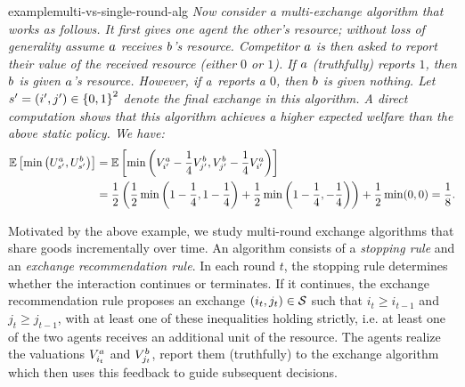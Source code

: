 \begin{restatable}{example}{multi-vs-single-round-alg}
    \emph{
    Now consider a multi-exchange algorithm that works as follows. It first gives one agent the other's resource; without loss of generality assume 
    $a$ receives $b$'s resource. 
    Competitor $a$ is then asked to report their value of the received resource
    (either $0$ or $1$). If $a$ (truthfully) reports $1$, then $b$ is 
    given $a$'s resource. 
    However, if $a$ reports a $0$, then $b$ is given nothing.
    Let $s'=(i',j')\in\left\{0,1\right\}^2$
    denote the final exchange in this algorithm. A direct computation shows that this algorithm achieves a higher expected welfare than the above static policy. We have:
    \begin{align*}
        \mathbb{E}\left[
            \min\left(
                U^a_{s'},U^b_{s'}
            \right)
        \right] 
        &=
        \mathbb{E}\left[
            \min\left(
                V^a_{i'}
                -
                \frac{1}{4}
                V^b_{j'}
                ,
                V^b_{j'}
                -
                \frac{1}{4}
                V^a_{i'}
            \right)
        \right] 
        \\
        &=
        \frac{1}{2}
        \left(
            \frac{1}{2}
            \min\left(
                1-\frac{1}{4}
                ,
                1-\frac{1}{4}
            \right)
            +
            \frac{1}{2}
            \min\left(
                1-\frac{1}{4}
                ,
                -\frac{1}{4}
            \right)
        \right)
        +
        \frac{1}{2}\min(0,0)
        =
        \frac{1}{8} .
    \end{align*}  
    }
\end{restatable}  


Motivated by the above example, we study multi-round exchange algorithms that share goods incrementally over time. 
An algorithm consists of a \emph{stopping rule} and an \emph{exchange recommendation rule}. In each round $t$, 
the stopping rule determines whether the interaction continues or terminates. If it continues, the exchange 
recommendation rule proposes an exchange $(i_{t}, j_{t}) \in \mathcal{S}$ such that $i_{t} \ge i_{t-1}$ and $j_{t} \ge j_{t-1}$, 
with at least one of these inequalities holding strictly, i.e. at least one of the two agents receives an additional unit of the resource. 
The agents realize the valuations $V^a_{i_t}$ and $V^b_{j_t}$, report them (truthfully) to the exchange algorithm which 
then uses this feedback to guide subsequent decisions.



